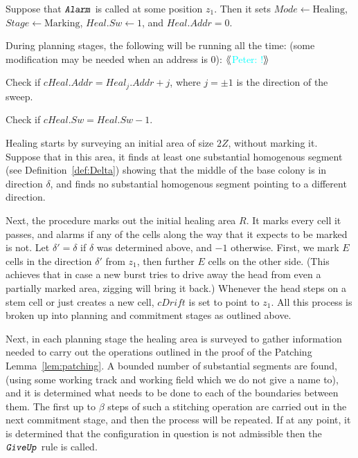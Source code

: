 \documentclass[12pt]{memoir}
\newcommand{\authnote}[3]
{{ \textcolor{#3}{\( \langle\hspace{-0.2em}\langle \)\textsf{\footnotesize #1: #2}\( \rangle\hspace{-0.2em}\rangle \)}}}
\newcommand{\authnote}[2]{}
\newcommand{\Pnote}[1]{{\authnote{Peter}{#1}{cyan}}}
\newcommand{\fld}[1]{\ensuremath{\textit{#1}}}
\newcommand{\rul}[1]{\ensuremath{\texttt{\slshape #1\/}}}
\newcommand{\E}{E}
\newcommand{\R}{R}
\newcommand{\Z}{Z}
\newcommand{\Addr}{\fld{Addr}}
\newcommand{\cDrift}{\fld{cDrift}}
\newcommand{\Mode}{\fld{Mode}}
\newcommand{\Heal}{\fld{Heal}}
\newcommand{\cHeal}{\fld{cHeal}}
\newcommand{\Stage}{\fld{Stage}}
\newcommand{\Sweep}{\fld{Sw}}
\newcommand{\Marking}{\mathrm{Marking}}
\newcommand{\Healing}{\mathrm{Healing}}
\newcommand{\Alarm}{\rul{Alarm}}
\newcommand{\GiveUp}{\rul{GiveUp}}
\begin{document}
Suppose that \( \Alarm \) is called at some position \( z_{1} \).
Then it sets  \( \Mode\gets\Healing \),  \( \Stage\gets\Marking \),
\( \Heal.\Sweep \gets 1 \), and \( \Heal.\Addr = 0 \).

During planning stages, the following  will be running
all the time: (some modification may be needed when an address is 0): \Pnote{!}
        \begin{bullets}
                  \item Check if \( \cHeal.\Addr = \Heal_{j}.\Addr + j \), where
                        \( j = \pm 1 \) is the direction of the sweep.
                  \item 
                        Check if \( \cHeal.\Sweep = \Heal.\Sweep -1 \).
              \end{bullets}

Healing starts by surveying an initial area of size \( 2\Z \), without marking it.
Suppose that in this area, it finds at least one substantial homogenous segment
(see Definition~\ref{def:Delta}) showing that the middle of the base colony
is in direction \( \delta \), and finds no substantial homogenous segment
pointing to a different direction.

Next, the procedure marks out the initial healing area \( \R \).
It marks every cell it passes, and alarms if any of the cells
along the way that it expects to be marked is not.
Let \( \delta'=\delta \) if \( \delta \) was determined above, and \( -1 \) otherwise.
First, we mark \( \E \) cells in the direction \( \delta' \)
from \( z_{1} \), then further \( \E \) cells on the other side.
(This achieves that in case a new burst tries to drive away the head from 
even a partially marked area, zigging will bring it back.)
Whenever the head steps on a stem cell or just creates a new cell, 
\( \cDrift \) is set to point to \( z_{1} \).
All this process is broken up into planning and commitment stages as outlined above.

Next, in each planning stage 
the healing area is surveyed to gather information needed to carry out the
operations outlined in the proof of the Patching Lemma~\ref{lem:patching}.
A bounded number of substantial segments are found, (using some working track and working
field which we do not give a name to), and it is determined what needs to be done
to each of the boundaries between them.
The first up to \( \beta \) steps of such a stitching operation are carried out in the
next commitment stage, and then the process will be repeated.
If at any point, it is determined that the configuration in question is not admissible
then the \( \GiveUp \) rule is called.
\end{document}

